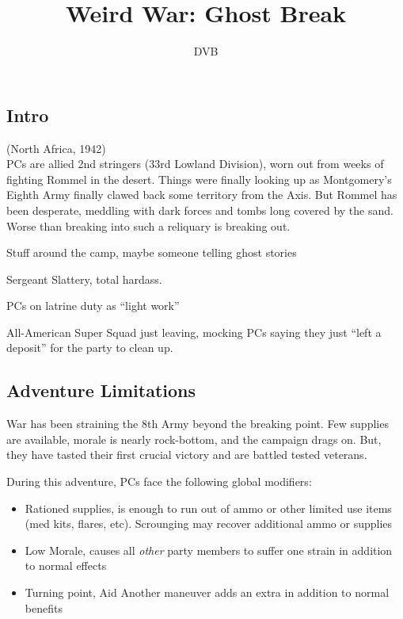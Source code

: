 \documentclass[background]{book}
\title{Weird War: Ghost Break}
\author{DVB}
\begin{document}
\maketitle

\begin{multicols}{2}
\section{Intro}
(North Africa, 1942)\\

    PCs are allied 2nd stringers (33rd Lowland Division), worn out from weeks of fighting Rommel in the desert.  Things were finally looking up as Montgomery's Eighth Army finally clawed back some territory from the Axis.  But Rommel has been desperate, meddling with dark forces and tombs long covered by the sand.  Worse than breaking into such a reliquary is breaking out\cdots.

Stuff around the camp, maybe someone telling ghost stories

Sergeant Slattery, total hardass.

PCs on latrine duty as ``light work''

All-American Super Squad just leaving, mocking PCs saying they just ``left a deposit'' for the party to clean up.

    \subsection{Adventure Limitations}

    War has been straining the 8th Army beyond the breaking point.  Few supplies are available, morale is nearly rock-bottom, and the campaign drags on.  But, they have tasted their first crucial victory and are battled tested veterans.
    
    During this adventure, PCs face the following global modifiers:

    \begin{itemize}
        \item Rationed supplies, \Threat\Threat is enough to run out of ammo or other limited use items (med kits, flares, etc).  Scrounging may recover additional ammo or supplies
        \item Low Morale, \Despair causes all \emph{other} party members to suffer one strain in addition to normal effects
        \item Turning point, Aid Another maneuver adds an extra \Advantage\Advantage in addition to normal benefits
    \end{itemize}


\end{multicols}
\end{document}
